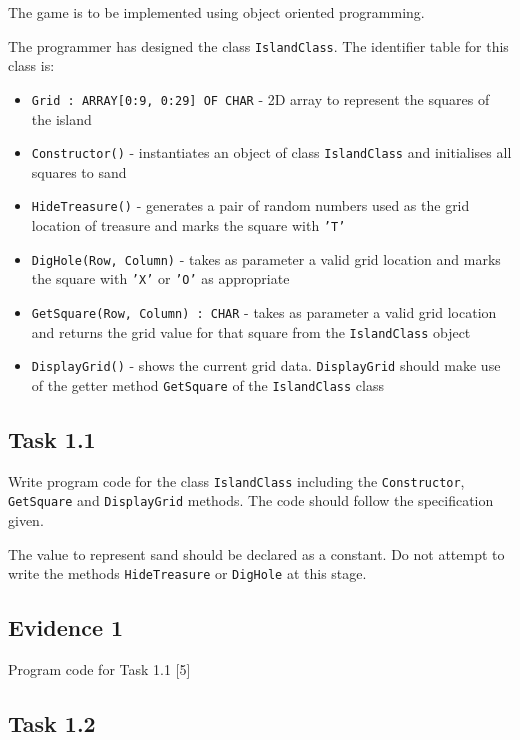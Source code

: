 The game is to be implemented using object oriented programming. 

The programmer has designed the class \texttt{IslandClass}. The identifier
table for this class is: 
\begin{itemize}
\item \texttt{Grid : ARRAY{[}0:9, 0:29{]} OF CHAR} - 2D array to represent
the squares of the island 
\item \texttt{Constructor()} - instantiates an object of class \texttt{IslandClass}
and initialises all squares to sand 
\item \texttt{HideTreasure()} - generates a pair of random numbers used
as the grid location of treasure and marks the square with \texttt{'T'} 
\item \texttt{DigHole(Row, Column)} - takes as parameter a valid grid location
and marks the square with \texttt{'X'} or \texttt{'O'} as appropriate 
\item \texttt{GetSquare(Row, Column) : CHAR} - takes as parameter a valid
grid location and returns the grid value for that square from the
\texttt{IslandClass} object 
\item \texttt{DisplayGrid()} - shows the current grid data. \texttt{DisplayGrid}
should make use of the getter method \texttt{GetSquare} of the \texttt{IslandClass}
class
\end{itemize}

\subsection*{Task 1.1 }

Write program code for the class \texttt{IslandClass} including the
\texttt{Constructor}, \texttt{GetSquare} and \texttt{DisplayGrid}
methods. The code should follow the specification given. 

The value to represent sand should be declared as a constant. Do not
attempt to write the methods \texttt{HideTreasure} or \texttt{DigHole}
at this stage.

\subsection*{Evidence 1}

Program code for Task 1.1\hfill{} {[}5{]}

\subsection*{Task 1.2 }

